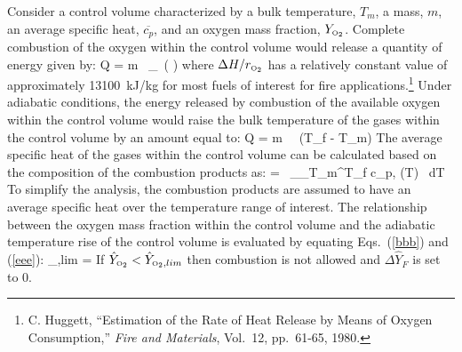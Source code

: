 Consider a control volume characterized
by a bulk temperature, $T_m$, a mass, $m$, an average specific heat, $\overline{c_p}$, and an oxygen mass
fraction, $Y_{\tiny \hbox{O}_2}$.  Complete combustion of the oxygen within the control volume would release a
quantity of energy given by:
\be
   Q = m \, _\OTWO \, \left(   \right)  \label{bbb}
\ee
where $\Delta H/r_{\tiny \hbox{O}_2}$ has a relatively constant value of
approximately 13100~kJ/kg for most fuels of interest for fire applications.\footnote{C. Huggett, ``Estimation of the Rate of Heat Release by Means of Oxygen
Consumption,'' {\em Fire and Materials}, Vol.~12, pp.~61-65, 1980.}
Under adiabatic conditions, the energy released by combustion of the available oxygen within
the control volume would raise the bulk temperature of the gases within the control volume by an
amount equal to:
\be
   Q = m \,  \, (T_f - T_m)  \label{eee}
\ee
The average specific heat of the gases within the control volume can be calculated based on the
composition of the combustion products as:
\be
    =  \, \sum_\alpha \int_{T_m}^{T_f} c_{p,\alpha} (T) \, dT
\ee
To simplify the analysis, the combustion products are assumed to have an average specific heat
over the temperature range of interest. The relationship between the oxygen mass fraction within the control volume and the adiabatic
temperature rise of the control volume is evaluated by equating Eqs.~(\ref{bbb}) and (\ref{eee}):
\be
   _{\OTWO,lim} = 
\ee
If $\hat{Y}_{{\tiny \hbox{O}_2}} < \hat{Y}_{{\tiny \hbox{O}_2},lim}$ then combustion is not allowed and  $\Delta \hat{Y}_{F}$ is set to 0.

